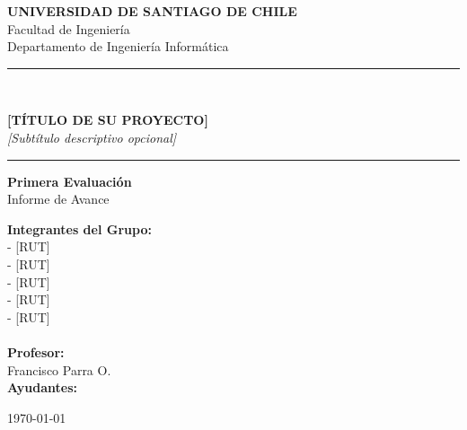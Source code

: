 \documentclass[11pt,letterpaper]{article}
\begin{document}
\begin{titlepage}
    \centering
    \vspace*{1cm}

    \Large{\textbf{UNIVERSIDAD DE SANTIAGO DE CHILE}}\\
    \large{Facultad de Ingeniería}\\
    \large{Departamento de Ingeniería Informática}\\

    \vspace{3cm}

    \rule{\textwidth}{0.5mm}\\
    \vspace{0.5cm}

    {\LARGE\textbf{[TÍTULO DE SU PROYECTO]}}\\
    \vspace{0.3cm}
    {\Large\textit{[Subtítulo descriptivo opcional]}}\\

    \vspace{0.5cm}
    \rule{\textwidth}{0.5mm}

    \vspace{2cm}

    {\Large\textbf{Primera Evaluación}}\\
    \vspace{0.5cm}
    {\large Informe de Avance}

    \vspace{3cm}

    \begin{minipage}{0.8\textwidth}
        \begin{flushleft}
            \large
            \textbf{Integrantes del Grupo:}\\
            [Nombre Completo 1] - [RUT]\\
            [Nombre Completo 2] - [RUT]\\
            [Nombre Completo 3] - [RUT]\\
            [Nombre Completo 4] - [RUT]\\
            [Nombre Completo 5] - [RUT]\\
            [Agregar más si es necesario]\\
            \vspace{0.5cm}
            \textbf{Profesor:}\\
            Francisco Parra O.\\
            \vspace{0.5cm}
            \textbf{Ayudantes:}\\
            [Si aplica]
        \end{flushleft}
    \end{minipage}

    \vfill

    {\large \today}
\end{titlepage}
\end{document}
